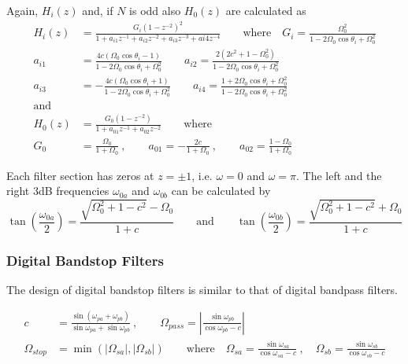Again, $H_i(z)$ and, if $N$ is odd also $H_0(z)$ are calculated as
\begin{align*}
	H_i(z) &= \frac{G_i (1-z^{-2})^2}{1 + a_{i1}z^{-1} + a_{i2}z^{-2} + a_{i3}z^{-3} + a{i4}z^{-4}}
	\qquad \text{where} \quad
	G_i = \frac{\Omega_0^2}{1-2\Omega_0\cos\theta_i+\Omega_0^2} \\
	a_{i1} &= \frac{4c(\Omega_0\cos\theta_i-1)}{1-2\Omega_0\cos\theta_i+\Omega_0^2} \qquad
	a_{i2} = \frac{2(2c^2+1-\Omega_0^2)}{1-2\Omega_0\cos\theta_i+\Omega_0^2} \\
	a_{i3} &= -\frac{4c(\Omega_0\cos\theta_i+1)}{1-2\Omega_0\cos\theta_i+\Omega_0^2} \qquad
	a_{i4} = \frac{1+2\Omega_0\cos\theta_i+\Omega_0^2}{1-2\Omega_0\cos\theta_i+\Omega_0^2} \\
	\text{and} \\
	H_0(z) &= \frac{G_0(1-z^{-2})}{1+a_{01}z^{-1}+a_{02}z^{-2}} \qquad \text{where} \\
	G_0 &= \frac{\Omega_0}{1+\Omega_0} \:,\qquad 
	a_{01} = -\frac{2c}{1+\Omega_0} \:,\qquad 
	a_{02} = \frac{1-\Omega_0}{1+\Omega_0}
\end{align*}

Each filter section has zeros at $z=\pm 1$, i.e. $\omega=0$ and $\omega=\pi$. 
The left and the right 3dB frequencies $\omega_{0a}$ and $\omega_{0b}$ can be
calculated by
\begin{equation*}
	\tan\left(\frac{\omega_{0a}}{2}\right) = \frac{\sqrt{\Omega_0^2+1-c^2}-\Omega_0}{1+c}
	\qquad \text{and} \qquad
	\tan\left(\frac{\omega_{0b}}{2}\right) = \frac{\sqrt{\Omega_0^2+1-c^2}+\Omega_0}{1+c}
\end{equation*}

\subsubsection{Digital Bandstop Filters}
The design of digital bandstop filters is similar to that of digital
bandpass filters.

\begin{align*}
	c &= \frac{\sin(\omega_{pa}+\omega_{pb})}{\sin\omega_{pa}+\sin\omega_{pb}}
	\:,\qquad
	\Omega_{pass} = \left| \frac{\sin\omega_{pb}}{\cos\omega_{pb}-c} \right| \\
	\Omega_{stop} &= \min\left(|\Omega_{sa}|,|\Omega_{sb}|\right)
	\qquad \text{where} \quad
	\Omega_{sa} = \frac{\sin\omega_{sa}}{\cos\omega_{sa}-c}\:,\quad
	\Omega_{sb} = \frac{\sin\omega_{sb}}{\cos\omega_{sb}-c}
\end{align*}

